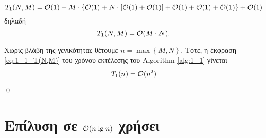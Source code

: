 	\begin{equation*}
		T_1(N,M)=\mathcal{O}(1)+M\cdot\left\{\mathcal{O}(1)+N\cdot\left[\mathcal{O}(1)+\mathcal{O}(1)\right]+\mathcal{O}(1)+\mathcal{O}(1)+\mathcal{O}(1)\right\}+\mathcal{O}(1)
	\end{equation*}
	δηλαδή
	\begin{equation}
		\label{eq:1_1_T(N,M)}
		T_1(N,M)=\mathcal{O}(M\cdot N).
	\end{equation}

	Χωρίς βλάβη της γενικότητας θέτουμε $n=\max\left\{M,N\right\}$. Τότε, η έκφραση \eqref{eq:1_1_T(N,M)} του χρόνου εκτέλεσης του {Algorithm \ref{alg:1_1}} γίνεται
	\begin{equation}
		\label{eq:1_1_T(n)}
		T_1(n)=\mathcal{O}(n^2)
	\end{equation}

	\qed

\section{Επίλυση σε $\mathcal{O}(n_{\;}\mathrm{lg_{\;}}n)$ χρήσει \dnc}

